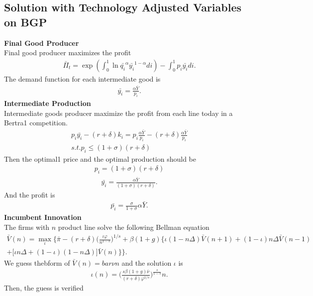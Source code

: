 \documentclass[a4paper,12pt]{article}
\begin{document}
\subsection{Solution with Technology Adjusted Variables on BGP}
\textbf{Final Good Producer}\\
Final good producer maximizes the profit
\begin{align}
    \bar{\Pi}_t = \exp (\int_0^1 \ln \bar{q_i}^\alpha \bar{y_i}^{1-\alpha} di) -\int_0^1 p_i \bar{y_i} di.
\end{align}
The demand function for each intermediate good is 
\begin{align}
    \bar{y_i} = \frac{\alpha\bar{Y}}{p_i}.
\end{align}
\textbf{Intermediate Production}\\
Intermediate goods producer maximize the profit from each line today in a Bertra1 competition.
\begin{align}
    p_i \bar{y_i} -(r+\delta)k_i = p_i \frac{\alpha\bar{Y}}{p_i} - (r+\delta)\frac{\alpha\bar{Y}}{p_i}\\
    s.t. p_i \leq (1+\sigma)(r+\delta)
\end{align}
Then the optimal1 price and the optimal production should be
\begin{align}
    p_i = (1+\sigma)(r+\delta)
\end{align}
\begin{align}
    \bar{y_i} = \frac{\alpha\bar{Y}}{(1+\sigma)(r+\delta)}.
\end{align}
And the profit is
\begin{align}
    \bar{p_i} = \frac{\sigma}{1+\sigma}\alpha\bar{Y}.
\end{align}
\textbf{Incumbent Innovation}\\
The firms with $n$ product line solve the following Bellman equation
\begin{align}
    \bar{V}(n) = \max_{\iota}\bigg\{\bar{\pi} - (r+\delta)\big(\frac{\iota\varphi}{n^{1-s}}\big)^{1/s} + \beta (1+g)\Big\{\iota (1-n\Delta)\bar{V}(n+1) + (1-\iota)n\Delta \bar{V}(n-1) \\ 
    + \big[\iota n\Delta+(1-\iota)(1-n\Delta)\big]\bar{V}(n) \Big\}
    \bigg\}.
\end{align}
We guess thebform of $\bar{V}(n) =bar{\nu} n $ and the solution $\iota$ is
\begin{align}
    \iota(n) = \Big(\frac{s\beta (1+g)\bar\nu}{(r+\delta)\varphi^{1/s}}\Big)^\frac{s}{1-s}n.
\end{align}
Then, the guess is verified
\end{document}
